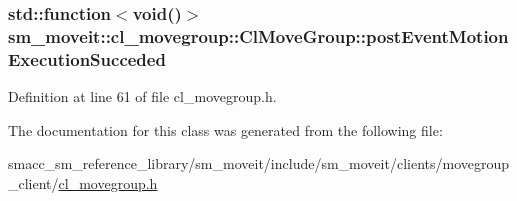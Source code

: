 \subsubsection[{\texorpdfstring{post\+Event\+Motion\+Execution\+Succeded}{postEventMotionExecutionSucceded}}]{\setlength{\rightskip}{0pt plus 5cm}std\+::function$<$void()$>$ sm\+\_\+moveit\+::cl\+\_\+movegroup\+::\+Cl\+Move\+Group\+::post\+Event\+Motion\+Execution\+Succeded\hspace{0.3cm}{\ttfamily [private]}}\hypertarget{classsm__moveit_1_1cl__movegroup_1_1ClMoveGroup_a1fde35aad5c4d3c0461d4b75553e6862}{}\label{classsm__moveit_1_1cl__movegroup_1_1ClMoveGroup_a1fde35aad5c4d3c0461d4b75553e6862}


Definition at line 61 of file cl\+\_\+movegroup.\+h.



The documentation for this class was generated from the following file\+:\begin{DoxyCompactItemize}
\item 
smacc\+\_\+sm\+\_\+reference\+\_\+library/sm\+\_\+moveit/include/sm\+\_\+moveit/clients/movegroup\+\_\+client/\hyperlink{cl__movegroup_8h}{cl\+\_\+movegroup.\+h}\end{DoxyCompactItemize}
